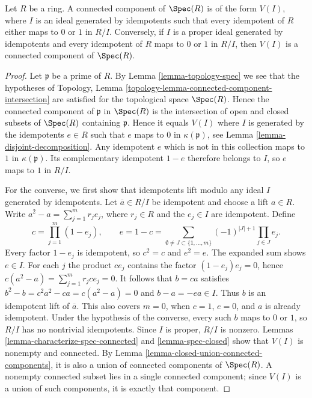 \begin{lemma}
\label{lemma-connected-component}
Let $R$ be a ring.
A connected component of
$\Spec(R)$ is of the form $V(I)$,
where $I$ is an ideal generated by idempotents
such that every idempotent of $R$ either maps to
$0$ or $1$ in $R/I$.
Conversely, if $I$ is a proper ideal generated by idempotents and
every idempotent of $R$ maps to $0$ or $1$ in $R/I$, then $V(I)$
is a connected component of $\Spec(R)$.
\end{lemma}

\begin{proof}
Let $\mathfrak p$ be a prime of $R$. By
Lemma \ref{lemma-topology-spec}
we see that the hypotheses of
Topology, Lemma \ref{topology-lemma-connected-component-intersection}
are satisfied for the topological space $\Spec(R)$.
Hence the connected component of $\mathfrak p$ in $\Spec(R)$
is the intersection of open and closed subsets of $\Spec(R)$
containing $\mathfrak p$. Hence it equals $V(I)$ where
$I$ is generated by the idempotents $e \in R$ such that $e$ maps to $0$
in $\kappa(\mathfrak p)$, see
Lemma \ref{lemma-disjoint-decomposition}.
Any idempotent $e$ which is not in this collection maps to $1$
in $\kappa(\mathfrak p)$. Its complementary idempotent $1-e$
therefore belongs to $I$, so $e$ maps to $1$ in $R/I$.

\medskip\noindent
For the converse, we first show that idempotents lift modulo any ideal
$I$ generated by idempotents. Let $\overline a\in R/I$ be idempotent
and choose a lift $a\in R$. Write
$a^2-a=\sum_{j=1}^m r_je_j$, where $r_j\in R$ and the $e_j\in I$
are idempotent. Define
$$
c=\prod_{j=1}^m(1-e_j),\qquad
e=1-c=
\sum_{\emptyset\ne J\subset\{1,\ldots,m\}}
(-1)^{|J|+1}\prod_{j\in J}e_j.
$$
Every factor $1-e_j$ is idempotent, so $c^2=c$ and $e^2=e$.
The expanded sum shows $e\in I$. For each $j$ the product $ce_j$
contains the factor $(1-e_j)e_j=0$, hence
$c(a^2-a)=\sum_{j=1}^m r_jce_j=0$.
It follows that $b=ca$ satisfies
$b^2-b=c^2a^2-ca=c(a^2-a)=0$ and $b-a=-ea\in I$.
Thus $b$ is an idempotent lift of $\overline a$.
This also covers $m=0$, when $c=1$, $e=0$, and $a$ is already idempotent.
Under the hypothesis of the converse, every such $b$ maps to $0$ or $1$,
so $R/I$ has no nontrivial idempotents. Since $I$ is proper, $R/I$ is
nonzero. Lemmas \ref{lemma-characterize-spec-connected} and
\ref{lemma-spec-closed} show that $V(I)$ is nonempty and connected.
By Lemma \ref{lemma-closed-union-connected-components}, it is also
a union of connected components of $\Spec(R)$. A nonempty connected
subset lies in a single connected component; since $V(I)$ is a union
of such components, it is exactly that component.
\end{proof}